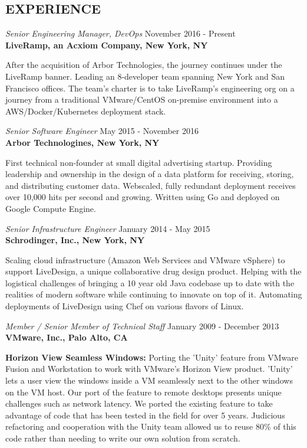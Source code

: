 \documentclass[overlapped,line,margin]{res}
\begin{document}
\begin{resume}
\section{EXPERIENCE}
{\sl Senior Engineering Manager, DevOps} \hfill November 2016 - Present \\
\textbf{LiveRamp, an Acxiom Company, New York, NY}

  After the acquisition of Arbor Technologies, the journey continues under
  the LiveRamp banner. Leading an 8-developer team spanning New York
  and San Francisco offices. The team's charter is to take LiveRamp's
  engineering org on a journey from a traditional VMware/CentOS
  on-premise environment into a AWS/Docker/Kubernetes deployment stack.

{\sl Senior Software Engineer} \hfill May 2015 - November 2016 \\
\textbf{Arbor Technologines, New York, NY}

  First technical non-founder at small digital advertising startup. Providing
  leadership and ownership in the design of a data platform for receiving,
  storing, and distributing customer data. Webscaled, fully redundant
  deployment receives over 10,000 hits per second and growing. Written using Go
  and deployed on Google Compute Engine.

{\sl Senior Infrastructure Engineer} \hfill January 2014 - May 2015 \\
\textbf{Schrodinger, Inc., New York, NY}

  Scaling cloud infrastructure (Amazon Web Services and VMware vSphere) to
  support LiveDesign, a unique collaborative drug design product. Helping with
  the logistical challenges of bringing a 10 year old Java codebase up to date
  with the realities of modern software while continuing to innovate on top of
  it. Automating deployments of LiveDesign using Chef on various flavors of
  Linux.

{\sl Member / Senior Member of Technical Staff} \hfill January 2009 - December 2013 \\
\textbf{VMware, Inc., Palo Alto, CA}

  \textbf{Horizon View Seamless Windows:} Porting the 'Unity' feature
  from VMware Fusion and Workstation to work with VMware's Horizon View product.
  'Unity' lets a user view the windows inside a VM seamlessly next to the other
  windows on the VM host. Our port of the feature to remote desktops presents
  unique challenges such as network latency. We ported the existing feature to
  take advantage of code that has been tested in the field for over 5 years.
  Judicious refactoring and cooperation with the Unity team allowed us to reuse
  80\% of this code rather than needing to write our own solution from scratch.


\end{resume}
\end{document}
